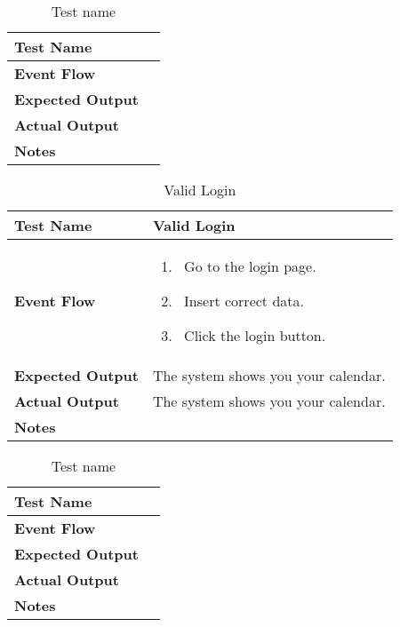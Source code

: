 \begin{table}[h]	
\centering
\def\arraystretch{1.5}
\begin{tabular}{|m{7cm}|m{7cm}|}
	\hline
	\textbf{Test Name}            &    \\ \hline
	\textbf{Event Flow}             &   \\ \hline
	\textbf{Expected Output}  &     \\ \hline
	\textbf{Actual Output}       &     \\ \hline
	\textbf{Notes} & \\ \hline
\end{tabular}
\caption{Test name}
\end{table}


\begin{table}[h]	
\centering
\def\arraystretch{1.5}
\begin{tabular}{|m{7cm}|m{7cm}|}
	\hline
	\textbf{Test Name}            &  Valid Login  \\ \hline
	\textbf{Event Flow}             &  
		\begin{enumerate}
			\item~Go to the login page.
			\item~Insert correct data.
			\item~Click the login button.
		\end{enumerate}
	 \\ \hline
	\textbf{Expected Output}  &  The system shows you your calendar.   \\ \hline
	\textbf{Actual Output}       &  The system shows you your calendar.   \\ \hline
	\textbf{Notes} & \\ \hline
\end{tabular}
\caption{Valid Login}
\end{table}


\begin{table}[h]	
\centering
\def\arraystretch{1.5}
\begin{tabular}{|m{7cm}|m{7cm}|}
	\hline
	\textbf{Test Name}            &    \\ \hline
	\textbf{Event Flow}             &   \\ \hline
	\textbf{Expected Output}  &     \\ \hline
	\textbf{Actual Output}       &     \\ \hline
	\textbf{Notes} & \\ \hline
\end{tabular}
\caption{Test name}
\end{table}



